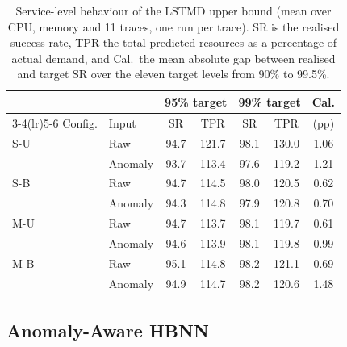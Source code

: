 \documentclass[conference]{IEEEtran}
\begin{document}
\begin{table}[!t]\caption{Service-level behaviour of the LSTMD upper bound (mean over CPU, memory and 11 traces, one run per trace). SR is the realised success rate, TPR the total predicted resources as a percentage of actual demand, and Cal.\ the mean absolute gap between realised and target SR over the eleven target levels from 90\% to 99.5\%.}
\label{tab:lstmd_service}
\centering
\footnotesize
\setlength{\tabcolsep}{3.6pt}
\begin{tabular}{llccccc}
\toprule
 & & \multicolumn{2}{c}{95\% target} & \multicolumn{2}{c}{99\% target} & Cal.\\
\cmidrule(lr){3-4}\cmidrule(lr){5-6}
Config. & Input & SR & TPR & SR & TPR & (pp)\\
\midrule
S-U & Raw & 94.7 & 121.7 & 98.1 & 130.0 & 1.06\\
 & Anomaly & 93.7 & 113.4 & 97.6 & 119.2 & 1.21\\
\addlinespace[2pt]
S-B & Raw & 94.7 & 114.5 & 98.0 & 120.5 & 0.62\\
 & Anomaly & 94.3 & 114.8 & 97.9 & 120.8 & 0.70\\
\addlinespace[2pt]
M-U & Raw & 94.7 & 113.7 & 98.1 & 119.7 & 0.61\\
 & Anomaly & 94.6 & 113.9 & 98.1 & 119.8 & 0.99\\
\addlinespace[2pt]
M-B & Raw & 95.1 & 114.8 & 98.2 & 121.1 & 0.69\\
 & Anomaly & 94.9 & 114.7 & 98.2 & 120.6 & 1.48\\
\bottomrule
\end{tabular}
\end{table}

\subsection{Anomaly-Aware HBNN}
\label{sec:hbnn_results}
\end{document}
